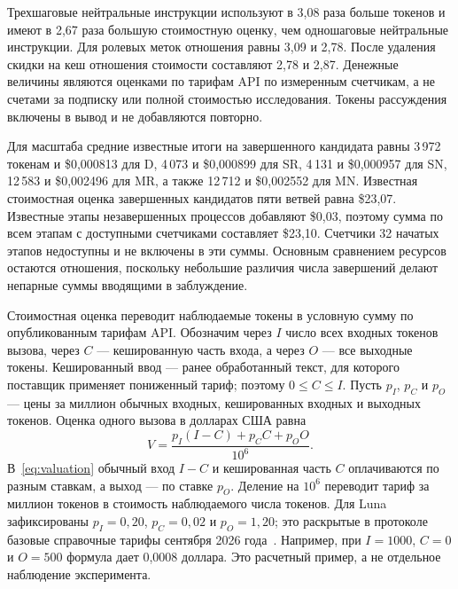 Трехшаговые нейтральные инструкции используют в 3,08 раза больше токенов и имеют в 2,67 раза большую стоимостную оценку, чем одношаговые нейтральные инструкции. Для ролевых меток отношения равны 3,09 и 2,78. После удаления скидки на кеш отношения стоимости составляют 2,78 и 2,87. Денежные величины являются оценками по тарифам API по измеренным счетчикам, а не счетами за подписку или полной стоимостью исследования. Токены рассуждения включены в вывод и не добавляются повторно.

Для масштаба средние известные итоги на завершенного кандидата равны 3\,972 токенам и \$0,000813 для D, 4\,073 и \$0,000899 для SR, 4\,131 и \$0,000957 для SN, 12\,583 и \$0,002496 для MR, а также 12\,712 и \$0,002552 для MN. Известная стоимостная оценка завершенных кандидатов пяти ветвей равна \$23,07. Известные этапы незавершенных процессов добавляют \$0,03, поэтому сумма по всем этапам с доступными счетчиками составляет \$23,10. Счетчики 32 начатых этапов недоступны и не включены в эти суммы. Основным сравнением ресурсов остаются отношения, поскольку небольшие различия числа завершений делают непарные суммы вводящими в заблуждение.

Стоимостная оценка переводит наблюдаемые токены в условную сумму по опубликованным тарифам API. Обозначим через $I$ число всех входных токенов вызова, через $C$ --- кешированную часть входа, а через $O$ --- все выходные токены. Кешированный ввод --- ранее обработанный текст, для которого поставщик применяет пониженный тариф; поэтому $0\le C\le I$. Пусть $p_I$, $p_C$ и $p_O$ --- цены за миллион обычных входных, кешированных входных и выходных токенов. Оценка одного вызова в долларах США равна
\begin{equation}
V=\frac{p_I(I-C)+p_C C+p_O O}{10^6}.
\label{eq:valuation}
\end{equation}
В~\eqref{eq:valuation} обычный вход $I-C$ и кешированная часть $C$ оплачиваются по разным ставкам, а выход --- по ставке $p_O$. Деление на $10^6$ переводит тариф за миллион токенов в стоимость наблюдаемого числа токенов. Для Luna зафиксированы $p_I=0{,}20$, $p_C=0{,}02$ и $p_O=1{,}20$; это раскрытые в протоколе базовые справочные тарифы сентября 2026 года~\cite{openai56luna2026,openaipricing2026}. Например, при $I=1000$, $C=0$ и $O=500$ формула дает 0,0008 доллара. Это расчетный пример, а не отдельное наблюдение эксперимента.

